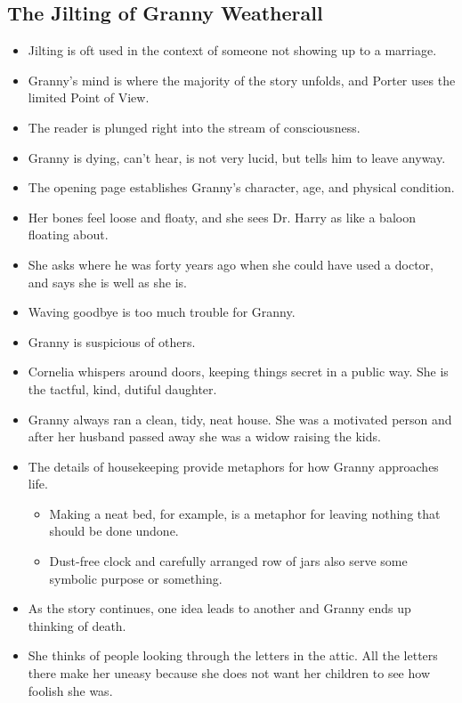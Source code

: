 \documentclass[11pt]{article}
\begin{document}
\subsection{The Jilting of Granny Weatherall}
\begin{itemize}
	\item Jilting is oft used in the context of someone not showing up to a 
		marriage.
	\item Granny's mind is where the majority of the story unfolds, and Porter
		uses the limited Point of View.  
	\item The reader is plunged right into the stream of consciousness.
	\item Granny is dying, can't hear, is not very lucid, but tells him to leave 
		anyway.
	\item The opening page establishes Granny's character, age, and physical
		condition.
	\item Her bones feel loose and floaty, and she sees Dr. Harry as like a baloon
		floating about.
	\item She asks where he was forty years ago when she could have used a doctor,
		and says she is well as she is.
	\item Waving goodbye is too much trouble for Granny.
	\item Granny is suspicious of others.
	\item Cornelia whispers around doors, keeping things secret in a public way. 
		She is the tactful, kind, dutiful daughter.
	\item Granny always ran a clean, tidy, neat house.  She was a motivated person
		and after her husband passed away she was a widow raising the kids.
	\item The details of housekeeping provide metaphors for how Granny approaches
		life.
		\begin{itemize}
			\item Making a neat bed, for example, is a metaphor for leaving nothing
				that should be done undone.
			\item Dust-free clock and carefully arranged row of jars also serve some
				symbolic purpose or something.
		\end{itemize}
	\item As the story continues, one idea leads to another and Granny ends up 
		thinking of death.
	\item She thinks of people looking through the letters in the attic.  All the
		letters there make her uneasy because she does not want her children to see
		how foolish she was.

\end{itemize}
\end{document}
